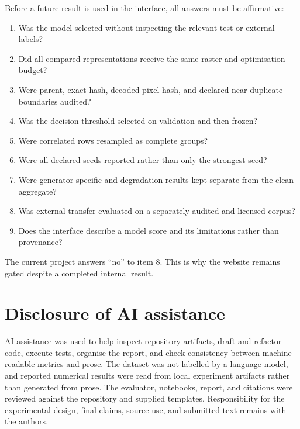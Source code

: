 \documentclass[12pt,a4paper]{article}
\begin{document}
Before a future result is used in the interface, all answers must be affirmative:

\begin{enumerate}
  \item Was the model selected without inspecting the relevant test or external labels?
  \item Did all compared representations receive the same raster and optimisation budget?
  \item Were parent, exact-hash, decoded-pixel-hash, and declared near-duplicate boundaries audited?
  \item Was the decision threshold selected on validation and then frozen?
  \item Were correlated rows resampled as complete groups?
  \item Were all declared seeds reported rather than only the strongest seed?
  \item Were generator-specific and degradation results kept separate from the clean aggregate?
  \item Was external transfer evaluated on a separately audited and licensed corpus?
  \item Does the interface describe a model score and its limitations rather than provenance?
\end{enumerate}

The current project answers ``no'' to item 8. This is why the website remains gated despite a
completed internal result.

\section{Disclosure of AI assistance}

AI assistance was used to help inspect repository artifacts, draft and refactor code, execute
tests, organise the report, and check consistency between machine-readable metrics and prose. The
dataset was not labelled by a language model, and reported numerical results were read from local
experiment artifacts rather than generated from prose. The evaluator, notebooks, report, and
citations were reviewed against the repository and supplied templates. Responsibility for the
experimental design, final claims, source use, and submitted text remains with the authors.
\end{document}

